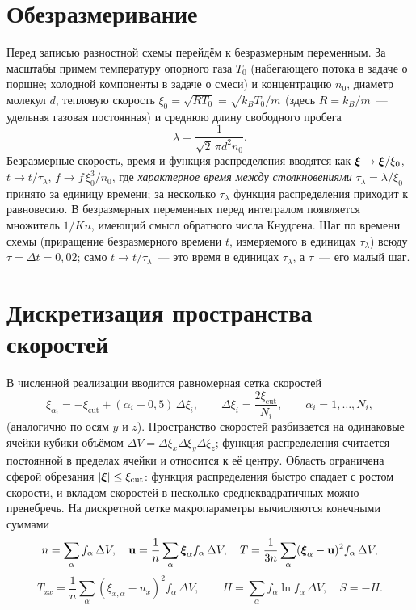 \section{Обезразмеривание}

Перед записью разностной схемы перейдём к безразмерным переменным.
За масштабы примем температуру опорного газа $T_0$ (набегающего потока в задаче о поршне; холодной компоненты в задаче о
смеси) и концентрацию $n_0$, диаметр молекул $d$, тепловую скорость $\xi_0=\sqrt{RT_0}=\sqrt{k_B T_0/m}$ (здесь
$R=k_B/m$~--- удельная газовая постоянная) и среднюю длину свободного пробега
\begin{equation}
  \lambda=\frac{1}{\sqrt{2}\,\pi d^2 n_0}.
\end{equation}
Безразмерные скорость, время и функция распределения вводятся как $\boldsymbol{\xi}\to\boldsymbol{\xi}/\xi_0$, $t\to t/\tau_\lambda$, $f\to
f\,\xi_0^3/n_0$, где \emph{характерное время между столкновениями} $\tau_\lambda=\lambda/\xi_0$ принято за единицу
времени; за несколько $\tau_\lambda$ функция распределения приходит к равновесию.
В безразмерных переменных перед интегралом появляется множитель $1/Kn$, имеющий смысл обратного числа Кнудсена.
Шаг по времени схемы (приращение безразмерного времени $t$, измеряемого в единицах $\tau_\lambda$) всюду $\tau=\Delta
t=0{,}02$; само $t\to t/\tau_\lambda$~--- это время в единицах $\tau_\lambda$, а $\tau$~--- его малый шаг.

\section{Дискретизация пространства скоростей}

В численной реализации вводится равномерная сетка скоростей
\begin{equation}
  \xi_{\alpha_i}=-\xi_{\mathrm{cut}}+(\alpha_i-0{,}5)\,\Delta\xi_i,\qquad
  \Delta\xi_i=\frac{2\xi_{\mathrm{cut}}}{N_i},\qquad \alpha_i=1,\dots,N_i,
\end{equation}
(аналогично по осям $y$ и $z$).
Пространство скоростей разбивается на одинаковые ячейки-кубики объёмом $\Delta V=\Delta\xi_x\Delta\xi_y\Delta\xi_z$;
функция распределения считается постоянной в пределах ячейки и относится к её центру.
Область ограничена сферой обрезания $|\boldsymbol{\xi}|\le\xi_{\mathrm{cut}}$: функция распределения быстро спадает с ростом
скорости, и вкладом скоростей в несколько среднеквадратичных можно пренебречь.
На дискретной сетке макропараметры вычисляются конечными суммами
\begin{equation}
  n=\sum_\alpha f_\alpha\,\Delta V,\quad
  \mathbf u=\frac1n\sum_\alpha \boldsymbol{\xi}_\alpha f_\alpha\,\Delta V,\quad
  T=\frac{1}{3n}\sum_\alpha (\boldsymbol{\xi}_\alpha-\mathbf u)^2 f_\alpha\,\Delta V,
\end{equation}
\begin{equation}
  T_{xx}=\frac1n\sum_\alpha (\xi_{x,\alpha}-u_x)^2 f_\alpha\,\Delta V,\qquad
  H=\sum_\alpha f_\alpha\ln f_\alpha\,\Delta V,\quad S=-H.
\end{equation}

